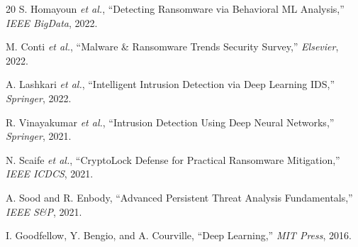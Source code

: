 \documentclass[conference]{IEEEtran}
\begin{document}
\begin{thebibliography}{20}
S. Homayoun \emph{et al.}, ``Detecting Ransomware via Behavioral ML Analysis,'' \emph{IEEE BigData}, 2022.

M. Conti \emph{et al.}, ``Malware \& Ransomware Trends Security Survey,'' \emph{Elsevier}, 2022.

A. Lashkari \emph{et al.}, ``Intelligent Intrusion Detection via Deep Learning IDS,'' \emph{Springer}, 2022.

R. Vinayakumar \emph{et al.}, ``Intrusion Detection Using Deep Neural Networks,'' \emph{Springer}, 2021.

N. Scaife \emph{et al.}, ``CryptoLock Defense for Practical Ransomware Mitigation,'' \emph{IEEE ICDCS}, 2021.

A. Sood and R. Enbody, ``Advanced Persistent Threat Analysis Fundamentals,'' \emph{IEEE S\&P}, 2021.

I. Goodfellow, Y. Bengio, and A. Courville, ``Deep Learning,'' \emph{MIT Press}, 2016.

\end{thebibliography}
\end{document}
